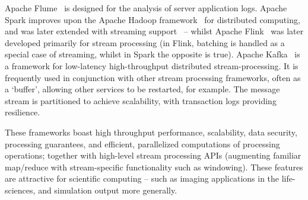 \documentclass[conference]{IEEEtran}
\begin{document}
Apache Flume~\cite{apacheflumeApacheFlume2016} is designed for the analysis of server application logs. Apache Spark improves upon the Apache Hadoop framework~\cite{ApacheHadoop2011} for distributed computing, and was later extended with streaming support~\cite{zahariaApacheSparkUnified2016} -- whilst Apache Flink~\cite{carboneApacheFlinkStream2015} was later developed primarily for stream processing (in Flink, batching is handled as a special case of streaming, whilst in Spark the opposite is true). Apache Kafka~\cite{kreps2011kafka} is a framework for low-latency high-throughput distributed stream-processing. It is frequently used in conjunction with other stream processing frameworks, often as a ‘buffer’, allowing other services to be restarted, for example. The message stream is partitioned to achieve scalability, with transaction logs providing resilience. 


These frameworks boast 
high throughput performance, scalability, data security, processing guarantees, and efficient, parallelized computations of processing operations; together with high-level stream processing APIs (augmenting familiar map/reduce with stream-specific functionality such as windowing). These features are attractive for scientific computing -- such as imaging applications in the life-sciences, and simulation output more generally.

\end{document}
